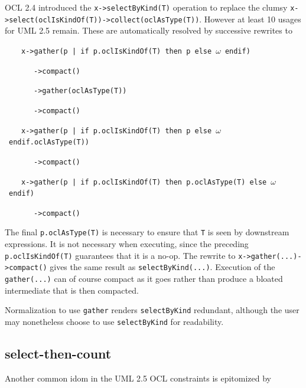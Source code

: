 \documentclass[
]{ceurart}
\begin{document}
OCL 2.4 introduced the \verb!x->selectByKind(T)! operation to replace the clumsy \verb!x->select(oclIsKindOf(T))->collect(oclAsType(T))!. However at least 10 usages for UML 2.5 remain. These are automatically resolved by successive rewrites to 

\begin{description}[itemsep=-0.2cm]\small\begin{samepage}
\item  ~~~~\verb!x->gather(p | if p.oclIsKindOf(T) then p else!~\(\omega\)~\verb!endif)!
\item  ~~~~~~~\verb!->compact()!
\item  ~~~~~~~\verb!->gather(oclAsType(T))!
\item  ~~~~~~~\verb!->compact()!
\end{samepage}\end{description}
\begin{description}[itemsep=-0.2cm]\small\begin{samepage}
\item  ~~~~\verb!x->gather(p | if p.oclIsKindOf(T) then p else!~\(\omega\)~\verb!endif.oclAsType(T))!
\item  ~~~~~~~\verb!->compact()!
\end{samepage}\end{description}
\begin{description}[itemsep=-0.2cm]\small\begin{samepage}
\item  ~~~~\verb!x->gather(p | if p.oclIsKindOf(T) then p.oclAsType(T) else!~\(\omega\)~\verb!endif)!
\item  ~~~~~~~\verb!->compact()!
\end{samepage}\end{description}

The final \verb!p.oclAsType(T)! is necessary to ensure that \verb!T! is seen by downstream expressions. It is not necessary when executing, since the preceding \verb!p.oclIsKindOf(T)! guarantees that it is a no-op. The rewrite to \verb!x->gather(...)->compact()! gives the same result as \verb!selectByKind(...)!. Execution of the \verb!gather(...)! can of course compact as it goes rather than produce a bloated intermediate that is then compacted.

Normalization to use  \verb!gather! renders \verb!selectByKind! redundant, although the user may nonetheless choose to use \verb!selectByKind! for readability.

\subsection{select-then-count}
Another common idom in the UML 2.5 OCL constraints is epitomized by
\end{document}
